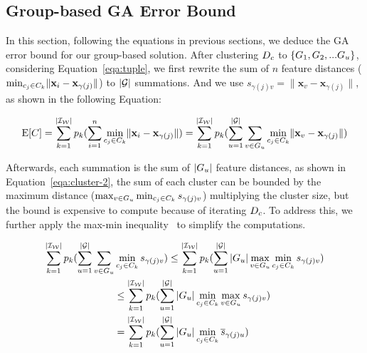 




\subsection{Group-based GA Error Bound}

In this section, following the equations in previous sections, we deduce the GA error bound for our group-based solution. 
%
After clustering $D_c$ to $\{ G_1 , G_2, ...G_u\}$, considering Equation~\ref{eqa:tuple}, we  first rewrite the sum of $n$ feature distances (\ie $\min_{c_j\in C_k}\lVert\mathbf{x}_i - \mathbf{x}_{\gamma(j)}\rVert$) to   $|\mathcal{G}|$ summations. And we use $s_{\gamma(j)v} = \lVert\mathbf{x}_v - \mathbf{x}_{\gamma(j)}\rVert$, as shown in the following Equation:

\begin{equation}\label{eqa:cluster-1}
    \mathrm{E}[C] = \sum_{k= 1}^{|\mathcal{I_W}|} p_k (\sum_{i=1}^n \min_{c_j\in C_k}\lVert\mathbf{x}_i - \mathbf{x}_{\gamma(j)}\rVert) =  \sum_{k= 1}^{|\mathcal{I_W}|} p_k (\sum_{u=1}^{|\mathcal{G}|}\sum_{v \in G_u} \min_{c_j\in C_k}\lVert\mathbf{x}_v - \mathbf{x}_{\gamma(j)}\rVert)
\end{equation}

Afterwards, each summation is the sum of $|G_u|$ feature distances, as shown in Equation~\ref{eqa:cluster-2},  the sum of each cluster can be bounded by  the maximum distance ($\max_{v \in G_u} \min_{c_j\in C_k} s_{\gamma(j)v}$)  multiplying the  cluster size, but the bound is expensive to compute because of iterating $D_c$. To address this, we further apply the max-min inequality~\cite{} to simplify the computations. 


\begin{equation}\label{eqa:cluster-2}
    \begin{aligned}
        \sum_{k= 1}^{|\mathcal{I_W}|} p_k (\sum_{u=1}^{|\mathcal{G}|}\sum_{v \in G_u} & \min_{c_j\in C_k} s_{\gamma(j)v}) \leq \sum_{k= 1}^{|\mathcal{I_W}|} p_k (\sum_{u=1}^{|\mathcal{G}|} |G_u| \max_{v \in G_u} \min_{c_j\in C_k}s_{\gamma(j)v}) \\
        & \leq \sum_{k= 1}^{|\mathcal{I_W}|} p_k (\sum_{u=1}^{|\mathcal{G}|} |G_u| \min_{c_j\in C_k} \max_{v \in G_u}s_{\gamma(j)v}) \\
        & =  \sum_{k= 1}^{|\mathcal{I_W}|} p_k (\sum_{u=1}^{|\mathcal{G}|} |G_u| \min_{c_j\in C_k} \overline{s}_{\gamma(j)u})
    \end{aligned}
\end{equation}



